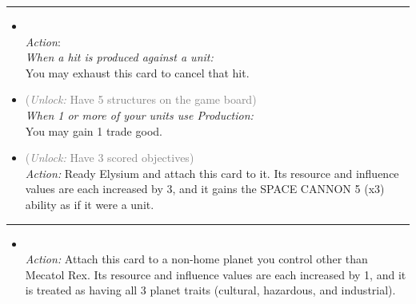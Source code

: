 \begin{multicols}{2}
\vspace{-10pt}\rule{\hsize}{0.4pt}\vspace{5pt}


\begin{itemize}
\item {}\\
\emph{Action}:\\
\emph{When a hit is produced against a unit:}
\\
You may exhaust this card to cancel that hit. 
\item {} \textcolor{gray}{(\emph{Unlock:} Have 5 structures on the game board)}\\
\emph{When 1 or more of your units use \emph{Production}:}
\\
You may gain 1 trade good. 
\item {} \textcolor{gray}{(\emph{Unlock:} Have 3 scored objectives)}\\
\emph{Action:} Ready Elysium and attach this card to it. Its resource and influence values are each increased by 3, and it gains the SPACE CANNON 5 (x3) ability as if it were a unit.
\end{itemize}

\vspace{-10pt}\rule{\hsize}{0.4pt}\vspace{5pt}


\begin{itemize}
\item {}\\
\emph{Action:} Attach this card to a non-home planet you control other than Mecatol Rex. Its resource and influence values are each increased by 1, and it is treated as having all 3 planet traits (cultural, hazardous, and industrial).
\end{itemize}

\end{multicols}



